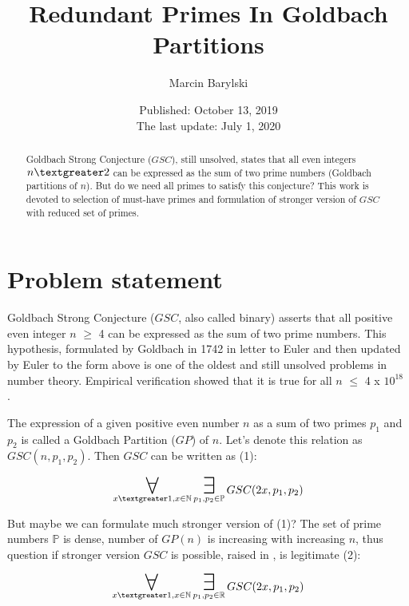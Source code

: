 \documentclass[10pt,twocolumn]{article}
\title{Redundant Primes In Goldbach Partitions}
\author{Marcin Barylski}
\date{\small{Published: October 13, 2019 \\ The last update: July 1, 2020}}
\newcommand\bigforall{\mbox{\huge $\mathsurround0pt\forall$}}
\newcommand\bigexists{\mbox{\huge $\mathsurround0pt\exists$}}
\begin{document}
\maketitle

\begin{abstract}
Goldbach Strong Conjecture ($GSC$), still unsolved, states that all even integers $n \textgreater 2$ can be expressed as the sum of two prime numbers (Goldbach partitions of $n$). But do we need all primes to satisfy this conjecture? This work is devoted to selection of must-have primes and formulation of stronger version of $GSC$ with reduced set of primes.
\end{abstract}

\section{Problem statement}

Goldbach Strong Conjecture ($GSC$, also called binary) asserts that all positive even integer $n$ $\geq$ 4 can be expressed as the sum of two prime numbers. This hypothesis, formulated by Goldbach in 1742 in letter to Euler \cite{goldbach1742} and then updated by Euler to the form above is one of the oldest and still unsolved problems in number theory. Empirical verification showed that it is true for all $n$ $\leq$ 4 x $10^{18}$ \cite{oliveira2012} \cite{oliveira2013}.\par
The expression of a given positive even number $n$ as a sum of two primes $p_1$ and $p_2$ is called a Goldbach Partition ($GP$) of $n$.  Let's denote this relation as $GSC(n, p_1, p_2)$. Then $GSC$ can be written as (1):

\begin{equation}
\displaystyle\mathop{\bigforall}_{x \textgreater 1, x \in \mathbb{N}} \displaystyle\mathop{\bigexists}_{p_1, p_2 \in \mathbb{P}} GSC (2x, p_1, p_2)
\end{equation}

But maybe we can formulate much stronger version of (1)? The set of prime numbers $\mathbb{P}$ is dense, number of $GP(n)$ is increasing with increasing $n$, thus question if stronger version $GSC$ is possible, raised in \cite{barylski2018}, is legitimate (2):

\begin{equation}
\displaystyle\mathop{\bigforall}_{x \textgreater 1, x \in \mathbb{N}} \displaystyle\mathop{\bigexists}_{p_1, p_2 \in \mathbb{R}} GSC (2x, p_1, p_2)
\end{equation}
\end{document}
